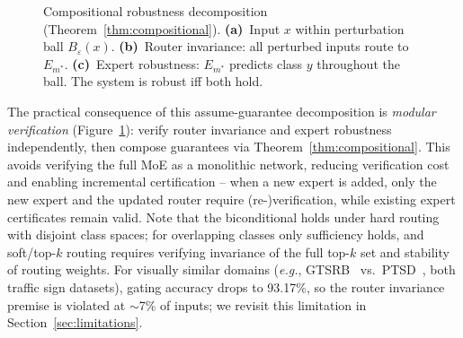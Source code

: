 \documentclass[runningheads]{llncs}
\begin{document}
\begin{figure}
\caption{Compositional robustness decomposition (Theorem~\ref{thm:compositional}). \textbf{(a)}~Input $x$ within perturbation ball $B_\varepsilon(x)$. \textbf{(b)}~Router invariance: all perturbed inputs route to $E_{m^*}$. \textbf{(c)}~Expert robustness: $E_{m^*}$ predicts class $y$ throughout the ball. The system is robust iff both hold.}
\label{fig:compositional-intuition}
\end{figure}

The practical consequence of this assume-guarantee decomposition is \emph{modular verification} (Figure~\ref{fig:compositional-intuition}): verify router invariance and expert robustness independently, then compose guarantees via Theorem~\ref{thm:compositional}. This avoids verifying the full MoE as a monolithic network, reducing verification cost and enabling incremental certification -- when a new expert is added, only the new expert and the updated router require (re-)verification, while existing expert certificates remain valid. Note that the biconditional holds under hard routing with disjoint class spaces; for overlapping classes only sufficiency holds, and soft/top-$k$ routing requires verifying invariance of the full top-$k$ set and stability of routing weights. For visually similar domains (\emph{e.g.}, GTSRB~\cite{gtsrb} vs.\ PTSD~\cite{ptsd}, both traffic sign datasets), gating accuracy drops to 93.17\%, so the router invariance premise is violated at ${\sim}$7\% of inputs; we revisit this limitation in Section~\ref{sec:limitations}.
\end{document}
